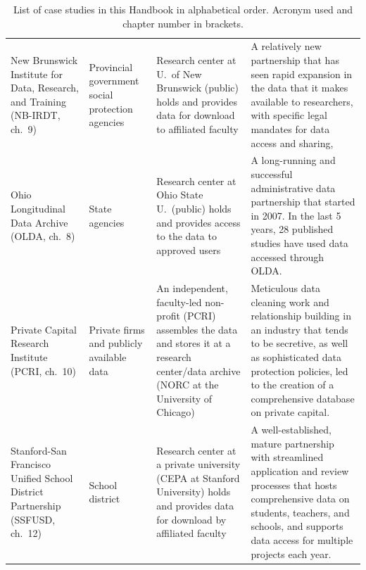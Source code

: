 \documentclass[11pt]{book}
\begin{document}
\begin{table}
\begin{tabular}[t]{>{\raggedright\arraybackslash}p{12em}>{\raggedright\arraybackslash}p{8em}>{\raggedright\arraybackslash}p{20em}>{\raggedright\arraybackslash}p{24em}}
New Brunswick Institute for Data, Research, and Training (NB-IRDT, ch.\ 9) & Provincial government social protection agencies & Research center at  U.\ of New Brunswick (public) holds and provides data for download to affiliated faculty & A relatively new partnership that has seen rapid expansion in the data that it makes available to researchers, with specific legal mandates for data access and sharing,\\
Ohio Longitudinal Data Archive (OLDA, ch.\ 8) & State agencies & Research center at Ohio State U.\ (public) holds and provides access to the data to approved users & A long-running and successful administrative data partnership that started in 2007. In the last 5 years, 28 published studies have used data accessed through OLDA.\\
Private Capital Research Institute (PCRI, ch.\ 10) & Private firms and publicly available data & An independent, faculty-led non-profit (PCRI) assembles the data and stores it at a research center/data archive (NORC at the University of Chicago) & Meticulous data cleaning work and relationship building in an industry that tends to be secretive, as well as sophisticated data protection policies, led to the creation of a comprehensive database on private capital.\\
Stanford-San Francisco Unified School District Partnership (SSFUSD, ch.\ 12) & School district & Research center at a private university (CEPA at Stanford University) holds and provides data for download by affiliated faculty & A well-established, mature partnership with streamlined application and review processes that hosts comprehensive data on students, teachers, and schools, and supports data access for multiple projects each year.\\
\bottomrule
\end{tabular}
\caption{\label{tab:introtable1}List of case studies in this Handbook in alphabetical order. Acronym used and chapter number in brackets.}

\end{table}
\end{document}
